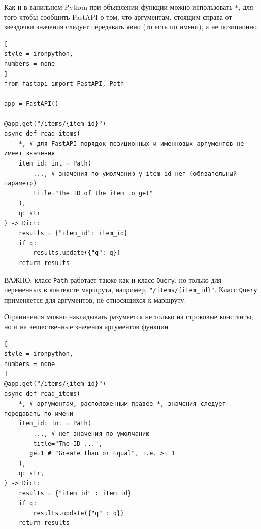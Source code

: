 \documentclass[%
	11pt,
	a4paper,
	utf8,
		]{article}
\begin{document}
Как и в ванильном Python при объявлении функции можно использовать \verb|*|, для того чтобы сообщить FastAPI о том, что аргументам, стоящим справа от звездочки значения следует передавать явно (то есть по имени), а не позиционно
\begin{lstlisting}[
style = ironpython,
numbers = none	
]
from fastapi import FastAPI, Path

app = FastAPI()

@app.get("/items/{item_id}")
async def read_items(
    *, # для FastAPI порядок позиционных и именновых аргументов не имеет значения
    item_id: int = Path(
        ..., # значения по умолчанию у item_id нет (обязательный параметр)
        title="The ID of the item to get"
    ),
    q: str
) -> Dict:
    results = {"item_id": item_id}
    if q:
        results.update({"q": q})
    return results
\end{lstlisting}

ВАЖНО: класс \texttt{Path} работает также как и класс \texttt{Query}, но только для переменных в контексте маршрута, например, \verb|"/items/{item_id}"|. Класс \texttt{Query} применяется для аргументов, не относящихся к маршруту.

Ограничения можно накладывать разумеется не только на строковые константы, но и на вещественные значения аргументов функции
\begin{lstlisting}[
style = ironpython,
numbers = none
]
@app.get("/items/{item_id}")
async def read_items(
    *, # аргументам, расположенным правее *, значения следует передавать по имени
    item_id: int = Path(
        ..., # нет значения по умолчанию
        title="The ID ...",
       ge=1 # "Greate than or Equal", т.е. >= 1
    ),
    q: str,
) -> Dict:
    results = {"item_id" : item_id}
    if q:
        results.update({"q" : q})
    return results
\end{lstlisting}
\end{document}

